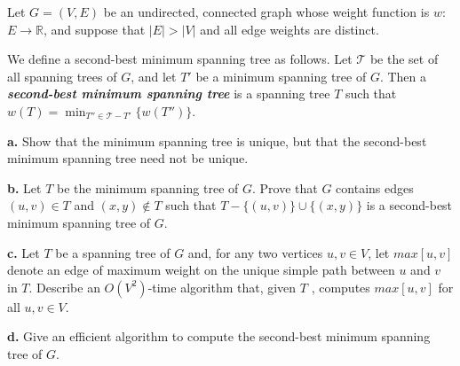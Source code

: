 Let $G = (V,E)$ be an undirected, connected graph whose weight function is $w$: 
$E \rightarrow \mathbb{R}$, and suppose that $|E| > |V|$ and all edge weights are 
distinct.

We define a second-best minimum spanning tree as follows. Let $\mathcal{T}$ be the 
set of all spanning trees of $G$, and let $T'$ be a minimum spanning tree of $G$. 
Then a \textit{\textbf{second-best minimum spanning tree}} is a spanning tree $T$ such 
that $w(T) = \min_{T'' \in \mathcal{T}-{T'}}\{w(T'')\}$.

\textbf{a.} Show that the minimum spanning tree is unique, but that the second-best 
minimum spanning tree need not be unique.

\textbf{b.} Let $T$ be the minimum spanning tree of $G$. Prove that $G$ contains edges
$(u,v) \in T$ and $(x,y) \notin T$ such that $T-\{(u,v)\}\cup\{(x,y)\}$ is a second-best 
minimum spanning tree of $G$.

\textbf{c.} Let $T$ be a spanning tree of $G$ and, for any two vertices $u,v \in V$, 
let $max[u,v]$ denote an edge of maximum weight on the unique simple path between 
$u$ and $v$ in $T$. Describe an $O(V^2)$-time algorithm that, given $T$ , computes 
$max[u,v]$ for all $u,v \in V$.

\textbf{d.} Give an efficient algorithm to compute the second-best minimum spanning 
tree of $G$.
